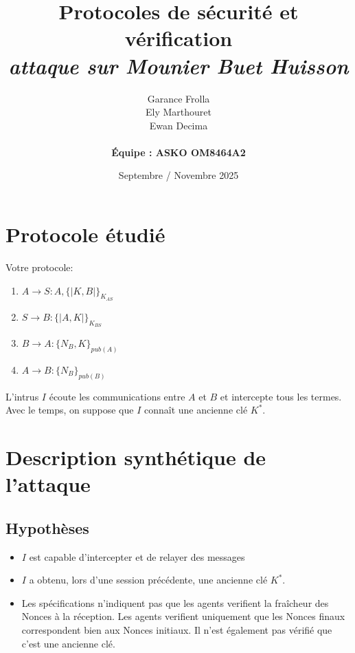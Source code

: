 \documentclass[11pt]{article}
\begin{document}
\title{\textbf{Protocoles de sécurité et vérification} \\
{\small \textit{attaque sur Mounier Buet Huisson}}}

\author{Garance Frolla \\ Ely Marthouret \\ Ewan Decima \\\\ \textbf{Équipe : ASKO OM8464A2}}
\date{Septembre / Novembre 2025}

\maketitle
\tableofcontents
\newpage

\section{Protocole étudié}

Votre protocole:

\begin{enumerate}
    \item $A \rightarrow S : A, \{|K,B|\}_{K_{AS}}$
    \item $S \rightarrow B : \{|A,K|\}_{K_{BS}}$
    \item $B \rightarrow A : \{N_B,K\}_{pub(A)}$
    \item $A \rightarrow B :  \{N_B\}_{pub(B)}$
\end{enumerate}

\bigskip
\noindent
L'intrus $I$ écoute les communications entre $A$ et $B$ et intercepte tous les termes. Avec le temps, on suppose que
$I$ connaît une ancienne clé $K^*$.

\section{Description synthétique de l'attaque}

\subsection{Hypothèses}
\begin{itemize}
    \item $I$ est capable d'intercepter et de relayer des messages 
    \item $I$ a obtenu, lors d'une session précédente, une ancienne clé $K^*$.
    \item Les spécifications n'indiquent pas que les agents verifient la fraîcheur des Nonces à la réception. Les agents verifient uniquement que les Nonces finaux correspondent bien aux Nonces initiaux. Il n'est également pas vérifié que c'est une ancienne clé.

    

\end{itemize}
\end{document}
